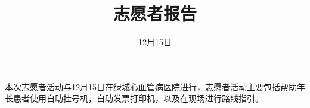 \documentclass{./Paper}
\title{志愿者报告}
\date{12月15日}
\begin{document}
\maketitle
本次志愿者活动与12月15日在绿城心血管病医院进行，志愿者活动主要包括帮助年长患者使用自助挂号机，自助发票打印机，以及在现场进行路线指引。
\begin{figure}[H]
    \centering
    \qquad
\end{figure}
\end{document}
